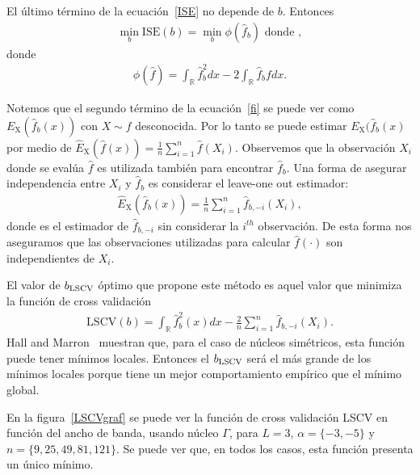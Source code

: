 El último término de la ecuación~\eqref{ISE} no depende de $b$. Entonces
\begin{align}
\nonumber \min_b \text{ISE}(b)= \min_b \phi(\widehat{f}_b) \text{ donde } ,
\end{align}
donde
\begin{align}
\label{fi}
\phi(\widehat{f})=\int_\mathbb{R} \widehat{f}_b^2 dx- 2 \int_\mathbb{R} \widehat{f}_b fdx.
\end{align}

Notemos que el segundo término de la ecuación~\eqref{fi} se puede ver como $E_\text{X}(\widehat{f}_b(x))$ con $X \sim f$ desconocida. Por lo tanto se puede estimar $E_\text{X}(\widehat{f}_b(x)$ por medio de $\widehat{E}_\text{X}(\widehat{f}(x))=\frac{1}{n}\sum_{i=1}^n \widehat{f}(X_i)$. Observemos que la observación $X_i$ donde se evalúa $\widehat{f}$ es utilizada también para encontrar $\widehat{f}_b$. Una forma de asegurar independencia entre $X_i$ y  $\widehat{f}_b$ es considerar el leave-one out estimador:
\begin{align}
\widehat{E}_\text{X}(\widehat{f}_b(x))=\frac{1}{n}\sum_{i=1}^n \widehat{f}_{b,-i}(X_i),
\end{align}	
donde  es el estimador de $\widehat{f}_{b,-i}$ sin considerar la $i^{th}$ observación. De esta forma nos aseguramos que las observaciones utilizadas para calcular  $\widehat{f}(\cdot)$ son independientes de $X_i.$

El valor de $b_{\tiny \text{LSCV}}$ óptimo que propone este método es aquel valor que minimiza la función de cross validación 
\begin{align}
\label{LSCV}
\text{LSCV}(b)=\int_\mathbb{R} \widehat{f}_b^2(x)dx - \frac{2}{n}\sum_{i=1}^n \widehat{f}_{b,-i}(X_i).
\end{align}
Hall and Marron~\cite{HallMarron1991} muestran que, para el caso de núcleos simétricos, esta función puede tener mínimos locales. Entonces el  $b_{\tiny \text{LSCV}}$ será el más grande de los mínimos locales porque tiene un mejor comportamiento empírico que el mínimo global.

En la figura~\ref{LSCVgraf} se puede ver la función de cross validación LSCV en función del ancho de banda, usando núcleo $\Gamma$, para $L=3$, $\alpha=\{-3,-5\}$ y $n=\{9,25,49,81,121\}$. Se puede ver que, en todos los casos, esta función presenta un único mínimo.


